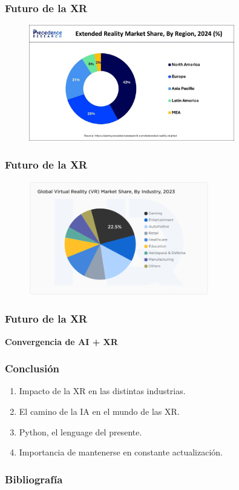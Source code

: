 \documentclass[aspectratio=169,17pt]{beamer}
\begin{document}
    \begin{frame}
        \frametitle{Futuro de la XR}
            \begin{figure}
                \centering
                \includegraphics[width=0.8\textwidth]{Gráfica 4.png}
                \label{Gra4}
            \end{figure}
    \end{frame}

    \begin{frame}
        \frametitle{Futuro de la XR}
            \begin{figure}
                \centering
                \includegraphics[width=0.7\textwidth]{Gráfica 5.png}
                \label{Gra5}
            \end{figure}
    \end{frame}

    \begin{frame}
        \frametitle{Futuro de la XR}
             \centering
              \textbf{Convergencia de AI + XR}
    \end{frame}
    
    \begin{frame}
        \frametitle{Conclusión}
            \begin{enumerate}
                \item Impacto de la XR en las distintas industrias.
                \item El camino de la IA en el mundo de las XR.
                \item Python, el lenguage del presente.
                \item Importancia de mantenerse en constante actualización.
            \end{enumerate}
    \end{frame}

    \begin{frame}
        \frametitle{Bibliografía}
    \end{frame}
        
\end{document}
